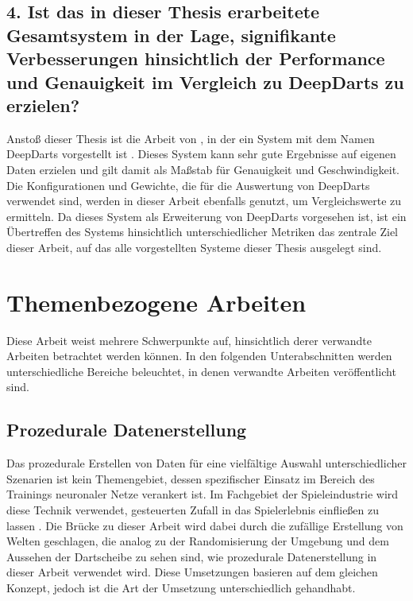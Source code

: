 \vspace*{-0.2cm}

\subsection*{4. Ist das in dieser Thesis erarbeitete Gesamtsystem in der Lage, signifikante Verbesserungen hinsichtlich der Performance und Genauigkeit im Vergleich zu DeepDarts zu erzielen?}

Anstoß dieser Thesis ist die Arbeit von \citeauthor{deepdarts}, in der ein System mit dem Namen DeepDarts vorgestellt ist \cite{deepdarts}. Dieses System kann sehr gute Ergebnisse auf eigenen Daten erzielen und gilt damit als Maßstab für Genauigkeit und Geschwindigkeit. Die Konfigurationen und Gewichte, die für die Auswertung von DeepDarts verwendet sind, werden in dieser Arbeit ebenfalls genutzt, um Vergleichswerte zu ermitteln. Da dieses System als Erweiterung von DeepDarts vorgesehen ist, ist ein Übertreffen des Systems hinsichtlich unterschiedlicher Metriken das zentrale Ziel dieser Arbeit, auf das alle vorgestellten Systeme dieser Thesis ausgelegt sind.


\section{Themenbezogene Arbeiten}
\label{sec:related_work}

Diese Arbeit weist mehrere Schwerpunkte auf, hinsichtlich derer verwandte Arbeiten betrachtet werden können. In den folgenden Unterabschnitten werden unterschiedliche Bereiche beleuchtet, in denen verwandte Arbeiten veröffentlicht sind.

\subsection{Prozedurale Datenerstellung}

Das prozedurale Erstellen von Daten für eine vielfältige Auswahl unterschiedlicher Szenarien ist kein Themengebiet, dessen spezifischer Einsatz im Bereich des Trainings neuronaler Netze verankert ist. Im Fachgebiet der Spieleindustrie wird diese Technik verwendet, gesteuerten Zufall in das Spielerlebnis einfließen zu lassen \cite{proc_data_games_1,proc_data_games_2,proc_data_games_3}. Die Brücke zu dieser Arbeit wird dabei durch die zufällige Erstellung von Welten geschlagen, die analog zu der Randomisierung der Umgebung und dem Aussehen der Dartscheibe zu sehen sind, wie prozedurale Datenerstellung in dieser Arbeit verwendet wird. Diese Umsetzungen basieren auf dem gleichen Konzept, jedoch ist die Art der Umsetzung unterschiedlich gehandhabt.

